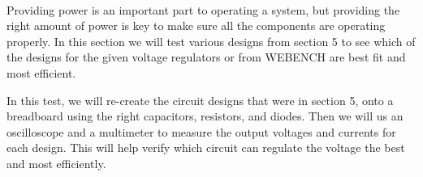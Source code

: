 \paragraph{}Providing power is an important part to operating a system, but providing the right amount of power is key to make sure all the components are operating properly. In this section we will test various designs from section 5 to see which of the designs for the given voltage regulators or from WEBENCH are best fit and most efficient. \par 
In this test, we will re-create the circuit designs that were in section 5, onto a breadboard using the right capacitors, resistors, and diodes. Then we will us an oscilloscope and a multimeter to measure the output voltages and currents for each design. This will help verify which circuit can regulate the voltage the best and most efficiently. \par

